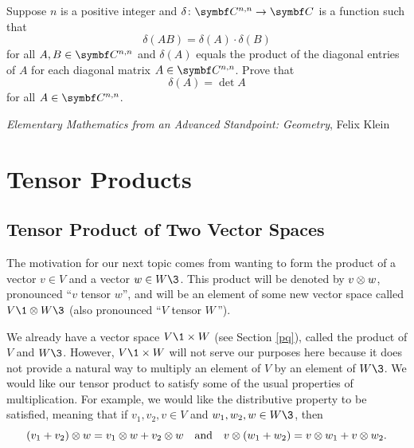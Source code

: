 \begin{exercises}
\exercise
Suppose $n$ is a positive integer and $\fun \delta {\C{n,n}} {\C{}}$ is a function such that
\[
\delta(AB) = \delta(A) \cdot \delta(B)
\]
for all $A, B \in \C{n,n}$ and $\delta(A)$ equals the product of the diagonal entries of $A$ for each diagonal matrix $A \in \C{n,n}$. Prove that
\[
\delta(A) = \det A
\]
for all $A \in \C{n,n}$.


\end{exercises}

{\textit{Elementary Mathematics from an Advanced Standpoint\textup{:} Geometry}, Felix Klein}

\section{Tensor Products} \label{9TensorSect}

\subsection{Tensor Product of Two Vector Spaces}

The motivation for our next topic comes from wanting to form the product of a vector $v \in V$ and a vector $w \in W\3$. This product will be denoted by $v \otimes w$, pronounced ``$v$ tensor $w$''\!, and will be an element of some new vector space called
$V\1 \tensor W\3$ (also pronounced ``$V$ tensor $W\,$'').

We already have a vector space $V\1 \times W$ (see Section \ref{pq}), called the product of $V$ and $W\3$. However, $V\1 \times W$ will not serve our purposes here because it does not provide a natural way to multiply an element of $V$ by an element of $W\3$. We would like our tensor product to satisfy some of the usual properties of multiplication. For example, we would like the distributive property to be satisfied, meaning that if $v_1, v_2, v \in V$ and $w_1, w_2, w \in W\3$, then
\[
(v_1 + v_2) \otimes w = v_1 \otimes w + v_2 \otimes w \quad \text{and} \quad v \otimes (w_1 + w_2) = v \otimes w_1 + v \otimes w_2.
\]

